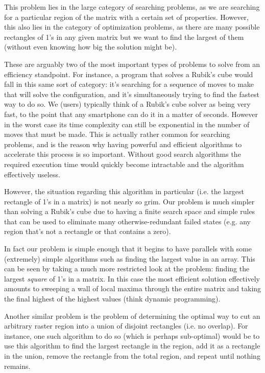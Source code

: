 \documentclass{article}
\begin{document}
This problem lies in the large category of searching problems, as we are searching for a particular region of the matrix with a certain set of properties.
However, this also lies in the category of optimization problems, as there are many possible rectangles of 1's in any given matrix but we want to find the largest of them (without even knowing how big the solution might be).

These are arguably two of the most important types of problems to solve from an efficiency standpoint.
For instance, a program that solves a Rubik's cube would fall in this same sort of category:
it's searching for a sequence of moves to make that will solve the configuration,
and it's simultaneously trying to find the fastest way to do so.
We (users) typically think of a Rubik's cube solver as being very fast, to the point that any smartphone can do it in a matter of seconds.
However in the worst case its time complexity can still be exponential in the number of moves that must be made.
This is actually rather common for searching problems, and is the reason why having powerful and efficient algorithms to accelerate this process is so important.
Without good search algorithms the required execution time would quickly become intractable and the algorithm effectively useless.

However, the situation regarding this algorithm in particular (i.e. the largest rectangle of 1's in a matrix) is not nearly so grim. Our problem is much simpler than solving a Rubik's cube due to having a finite search space and simple rules that can be used to eliminate many otherwise-redundant failed states (e.g. any region that's not a rectangle or that contains a zero).

In fact our problem is simple enough that it begins to have parallels with some (extremely) simple algorithms such as finding the largest value in an array.
This can be seen by taking a much more restricted look at the problem: finding the largest \textit{square} of 1's in a matrix.
In this case the most efficient solution effectively amounts to sweeping a wall of local maxima through the entire matrix and  taking the final highest of the highest values (think dynamic programming).

Another similar problem is the problem of determining the optimal way to cut an arbitrary raster region into a union of disjoint rectangles (i.e. no overlap).
For instance, one such algorithm to do so (which is perhaps sub-optimal) would be to use this algorithm to find the largest rectangle in the region, add it as a rectangle in the union, remove the rectangle from the total region, and repeat until nothing remains.
\end{document}
